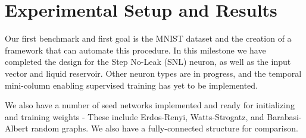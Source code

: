 \section{Experimental Setup and Results} \label{sec:ExperimentalSetup}

Our first benchmark and first goal is the MNIST dataset \cite{MNIST Dataset} and
the creation of a framework that can automate this procedure. In this milestone
we have completed the design for the Step No-Leak (SNL) neuron, as well as the
input vector and liquid reservoir. Other neuron types are in progress, and the
temporal mini-column enabling supervised training has yet to be implemented.

We also have a number of seed networks implemented and ready for initializing
and training weights - These include Erdos-Renyi, Watts-Strogatz, and Barabasi-
Albert random graphs. We also have a fully-connected structure for comparison.